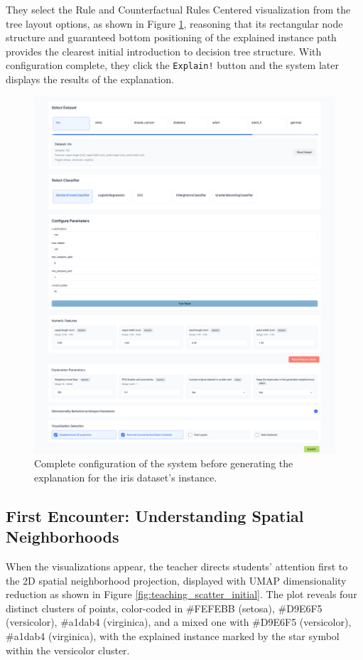They select the Rule and Counterfactual Rules Centered visualization from the tree layout options, as shown in Figure \ref{fig:teaching_config_complete}, reasoning that its rectangular node structure and guaranteed bottom positioning of the explained instance path provides the clearest initial introduction to decision tree structure. With configuration complete, they click the \texttt{Explain!} button and the system later displays the results of the explanation.

\begin{figure}
    \centering
    \includegraphics[width=\linewidth]{images/fullConfigTeacher.png}
    \caption{Complete configuration of the system before generating the explanation for the iris dataset's instance.}
    \label{fig:teaching_config_complete}
\end{figure}

\subsection{First Encounter: Understanding Spatial Neighborhoods}

When the visualizations appear, the teacher directs students' attention first to the 2D spatial neighborhood projection, displayed with UMAP dimensionality reduction as shown in Figure \ref{fig:teaching_scatter_initial}. The plot reveals four distinct clusters of points, color-coded in \#FEFEBB (setosa), \#D9E6F5 (versicolor), \#a1dab4 (virginica), and a mixed one with \#D9E6F5 (versicolor), \#a1dab4 (virginica), with the explained instance marked by the star symbol within the versicolor cluster.

